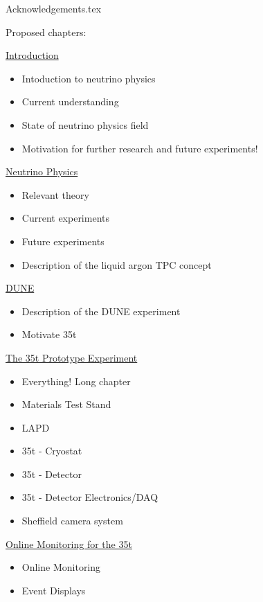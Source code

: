 \documentclass[a4paper,12pt]{report}
\begin{document}
\renewcommand{\thepage}{\roman{page}}

\tableofcontents

\listoftables
{}
\listoffigures
{}
{Acknowledgements.tex}

\pagebreak

Proposed chapters:

\underline{Introduction}
\begin{itemize}
  \item{Intoduction to neutrino physics}
  \item{Current understanding}
  \item{State of neutrino physics field}
  \item{Motivation for further research and future experiments!}
\end{itemize}

\underline{Neutrino Physics}
\begin{itemize}
  \item{Relevant theory}
  \item{Current experiments}
  \item{Future experiments}
  \item{Description of the liquid argon TPC concept}
\end{itemize}

\underline{DUNE}
\begin{itemize}
  \item{Description of the DUNE experiment}
  \item{Motivate 35t}
\end{itemize}

\underline{The 35t Prototype Experiment}
\begin{itemize}
  \item{Everything!  Long chapter}
  \item{Materials Test Stand}
  \item{LAPD}
  \item{35t - Cryostat}
  \item{35t - Detector}
  \item{35t - Detector Electronics/DAQ}
  \item{Sheffield camera system}
\end{itemize}

\underline{Online Monitoring for the 35t}
\begin{itemize}
  \item{Online Monitoring}
  \item{Event Displays}
\end{itemize}
\end{document}
